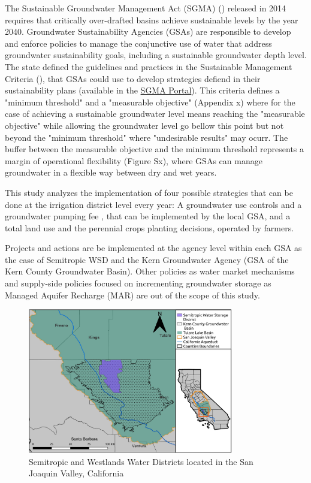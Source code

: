 \documentclass[11pt,a4paper]{article}
\begin{document}
 The Sustainable Groundwater Management Act (SGMA) (\cite{dwr_sustainable_2021}) released in 2014 requires that critically over-drafted basins achieve sustainable levels by the year 2040. Groundwater Sustainability Agencies (GSAs) are responsible to develop and enforce policies to manage the conjunctive use of water that address groundwater sustainability goals, including a sustainable groundwater depth level. The state defined the guidelines and practices in the Sustainable Management Criteria (\cite{dwr_sustainable_2017}), that GSAs could use to develop strategies defiend in their sustainability plans (available in the \hyperlink{https://water.ca.gov/Programs/Groundwater-Management/SGMA-Groundwater-Management/Groundwater-Sustainable-Agencies}{SGMA Portal}). This criteria defines a "minimum threshold" and a "measurable objective" (Appendix x) where for the case of achieving a sustainable groundwater level means reaching the "measurable objective" while allowing the groundwater level go bellow this point but not beyond the "minimum threshold" where "undesirable results" may ocurr. The buffer between the measurable objective and the minimum threshold represents a margin of operational flexibility (Figure Sx), where GSAs can manage groundwater in a flexible way between dry and wet years.  
  
This study analyzes the implementation of four possible strategies that can be done at the irrigation district level every year: A groundwater use controls and a groundwater pumping fee , that can be implemented by the local GSA, and a total land use and the perennial crops planting decisions, operated by farmers. 

Projects and actions are be implemented at the agency level within each GSA as the case of Semitropic WSD and the Kern Groundwater Agency (GSA of the Kern County Groundwater Basin).  Other policies as water market mechanisms and supply-side policies focused on incrementing groundwater storage as Managed Aquifer Recharge (MAR) \cite{} are out of the scope of this study. 

\begin{figure}[H]
    \centering
    \includegraphics[width=0.8\textwidth]{Map_Semitropic.jpg}
    \caption{Semitropic and Westlands Water Districts located in the San Joaquin Valley, California}
    \label{fig:1}
\end{figure}
\end{document}
